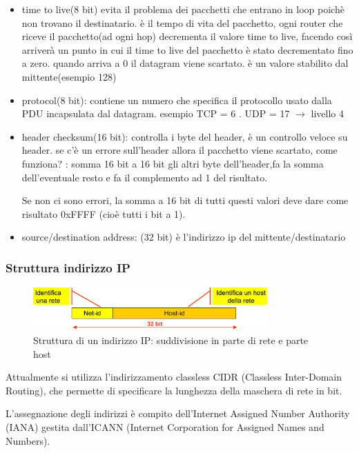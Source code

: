 \begin{itemize}
    \item time to live(8 bit) evita il problema dei pacchetti che entrano in loop poichè non trovano il destinatario. è il tempo di vita del pacchetto, ogni router che riceve il pacchetto(ad ogni hop) decrementa il valore time to live, facendo così arriverà un punto in cui il time to live del pacchetto è stato decrementato fino a zero. quando arriva a 0 il datagram viene scartato. è un valore stabilito dal mittente(esempio 128)
    \item protocol(8 bit): contiene un numero che specifica il protocollo usato dalla PDU incapsulata dal datagram. esempio TCP = 6 . UDP = 17 $\rightarrow$ livello 4
    \item header checksum(16 bit): controlla i byte del header, è un controllo veloce su header. se c'è un errore sull'header allora il pacchetto viene scartato, come funziona? : somma 16 bit a 16 bit gli altri byte dell’header,fa la somma dell'eventuale resto e fa il complemento ad 1 del risultato.

Se non ci sono errori, la somma a 16 bit di tutti questi valori deve dare come risultato 0xFFFF (cioè tutti i bit a 1).

\item source/destination address: (32 bit) è l'indirizzo ip del mittente/destinatario

\end{itemize}

\subsubsection{Struttura indirizzo IP}
\begin{figure}[h!]
    \centering
    \includegraphics[width=0.8\textwidth]{images/strutturaIP.png}
    \caption{Struttura di un indirizzo IP: suddivisione in parte di rete e parte host}
    \label{fig:strutturaIP}
\end{figure}

Attualmente si utilizza l'indirizzamento classless CIDR (Classless Inter-Domain Routing), che permette di specificare la lunghezza della maschera di rete in bit.

L'assegnazione degli indirizzi è compito dell'Internet Assigned Number
Authority (IANA) gestita dall'ICANN (Internet Corporation for Assigned
Names and Numbers).

